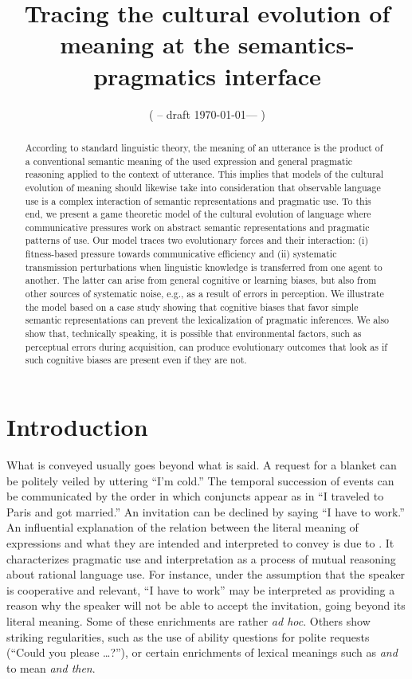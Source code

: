 \documentclass[a4paper]{article}
\title{Tracing the cultural evolution of meaning at the semantics-pragmatics interface}
\author{%
    ( -- draft \today --- )
}
\date{}
\begin{document}
\maketitle

\begin{abstract}
  According to standard linguistic theory, the meaning of an utterance is the product of a
  conventional semantic meaning of the used expression and general pragmatic reasoning applied
  to the context of utterance. This implies that models of the cultural evolution of meaning
  should likewise take into consideration that observable language use is a complex interaction
  of semantic representations and pragmatic use. To this end, we present a game theoretic model
  of the cultural evolution of language where communicative pressures work on abstract semantic
  representations and pragmatic patterns of use. Our model traces two evolutionary forces and
  their interaction: (i) fitness-based pressure towards communicative efficiency and (ii)
  systematic transmission perturbations when linguistic knowledge is transferred from one agent
  to another. The latter can arise from general cognitive or learning biases, but also from
  other sources of systematic noise, e.g., as a result of errors in perception. We illustrate
  the model based on a case study showing that cognitive biases that favor simple semantic
  representations can prevent the lexicalization of pragmatic inferences. We also show that,
  technically speaking, it is possible that environmental factors, such as perceptual errors
  during acquisition, can produce evolutionary outcomes that look as if such cognitive biases
  are present even if they are not.
\end{abstract}

\section{Introduction}\label{sec:introduction}
What is conveyed usually goes beyond what is said. A request for a blanket can be politely
veiled by uttering ``I'm cold.'' The temporal succession of events can be communicated by the
order in which conjuncts appear as in ``I traveled to Paris and got married.'' An invitation
can be declined by saying ``I have to work.'' An influential explanation of the relation
between the literal meaning of expressions and what they are intended and interpreted to convey
is due to \citet{grice:1975}. It characterizes pragmatic use and interpretation as a process of
mutual reasoning about rational language use. For instance, under the assumption that the
speaker is cooperative and relevant, ``I have to work'' may be interpreted as providing a
reason why the speaker will not be able to accept the invitation, going beyond its literal
meaning. Some of these enrichments are rather \emph{ad hoc}. Others show striking regularities,
such as the use of ability questions for polite requests (``Could you please \dots?''), or
certain enrichments of lexical meanings such as \emph{and} to mean \emph{and then}.
\end{document}
